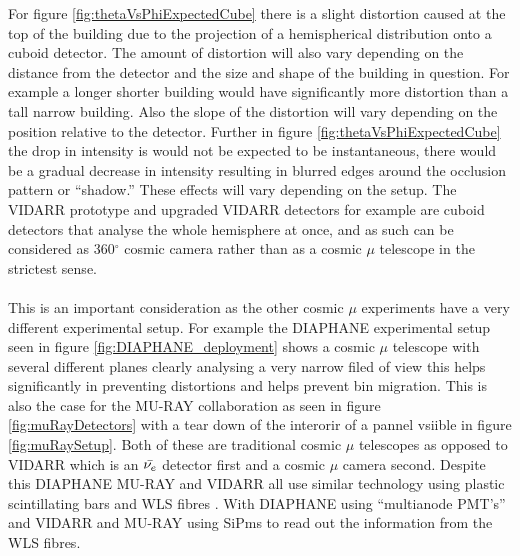 For figure \ref{fig:thetaVsPhiExpectedCube} there is a slight distortion caused at the top of the building due to the projection of a hemispherical distribution onto a cuboid detector. The amount of distortion will also vary depending on the distance from the detector and the size and shape of the building in question. For example a longer shorter building would have significantly more distortion than a tall narrow building. Also the slope of the distortion will vary depending on the position relative to the detector. Further in figure \ref{fig:thetaVsPhiExpectedCube} the drop in intensity is would not be expected to be instantaneous, there would be a gradual decrease in intensity resulting in blurred edges around the occlusion pattern or ``shadow.'' These effects will vary depending on the setup. The VIDARR prototype and upgraded VIDARR detectors for example are cuboid detectors that analyse the whole hemisphere at once, and as such can be considered as 360$^\circ$ cosmic camera rather than as a cosmic $\mu$ telescope in the strictest sense. 
\\\\This is an important consideration as the other cosmic $\mu$ experiments have a very different experimental setup. For example the DIAPHANE experimental setup seen in figure \ref{fig:DIAPHANE_deployment} shows a cosmic $\mu$ telescope with several different planes clearly analysing a very narrow filed of view this helps significantly in preventing distortions and helps prevent bin migration. This is also the case for the MU-RAY collaboration as seen in figure \ref{fig:muRayDetectors} with a tear down of the interorir of a pannel vsiible in figure \ref{fig:muRaySetup}. Both of these are traditional cosmic $\mu$ telescopes as opposed to VIDARR which is an $\Bar{\nu_e}$ detector first and a cosmic $\mu$ camera second. Despite this DIAPHANE MU-RAY and VIDARR all use similar technology using plastic scintillating bars and WLS fibres \cite{Carroll_2018} \cite{Marteau_2017} \cite{ANASTASIO2013423}. With DIAPHANE using ``multianode PMT’s''  \cite{Marteau_2017} and VIDARR and MU-RAY using SiPms \cite{Carroll_2018} \cite{ANASTASIO2013423} to read out the information from the WLS fibres. 
